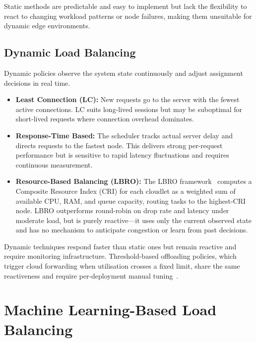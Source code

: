 Static methods are predictable and easy to implement but lack the
flexibility to react to changing workload patterns or node
failures, making them unsuitable for dynamic edge environments.

\subsection{Dynamic Load Balancing}

Dynamic policies observe the system state continuously and adjust
assignment decisions in real time.

\begin{itemize}
  \item \textbf{Least Connection (LC):} New requests go to the
  server with the fewest active connections. LC suits long-lived
  sessions but may be suboptimal for short-lived requests where
  connection overhead dominates.

  \item \textbf{Response-Time Based:} The scheduler tracks actual
  server delay and directs requests to the fastest node. This
  delivers strong per-request performance but is sensitive to
  rapid latency fluctuations and requires continuous measurement.

  \item \textbf{Resource-Based Balancing (LBRO):} The LBRO
  framework~\cite{nayyer2022lbro} computes a Composite Resource
  Index (CRI) for each cloudlet as a weighted sum of available
  CPU, RAM, and queue capacity, routing tasks to the highest-CRI
  node. LBRO outperforms round-robin on drop rate and latency
  under moderate load, but is purely reactive---it uses only the
  current observed state and has no mechanism to anticipate
  congestion or learn from past decisions.
\end{itemize}

Dynamic techniques respond faster than static ones but remain
reactive and require monitoring infrastructure. Threshold-based
offloading policies, which trigger cloud forwarding when
utilisation crosses a fixed limit, share the same reactiveness
and require per-deployment manual tuning~\cite{mach2017mobile}.

\section{Machine Learning-Based Load Balancing}
\label{sec:lit_ml}

